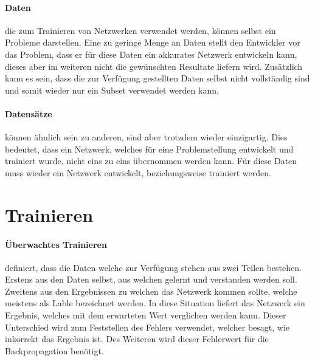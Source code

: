 
\paragraph{Daten} die zum Trainieren von Netzwerken verwendet werden, können selbst ein Probleme darstellen.
Eine zu geringe Menge an Daten stellt den Entwickler vor das Problem, dass er für diese Daten ein akkurates Netzwerk entwickeln kann, dieses aber im weiteren nicht die gewünschten Resultate liefern wird.
Zusätzlich kann es sein, dass die zur Verfügung gestellten Daten selbst nicht vollständig sind und somit wieder nur ein Subset verwendet werden kann.

\paragraph{Datensätze} können ähnlich sein zu anderen, sind aber trotzdem wieder einzigartig. 
Dies bedeutet, dass ein Netzwerk, welches für eine Problemstellung entwickelt und trainiert wurde, nicht eins zu eins übernommen werden kann.
Für diese Daten muss wieder ein Netzwerk entwickelt, beziehungsweise trainiert werden.

\section{Trainieren}

\paragraph{Überwachtes Trainieren} definiert, dass die Daten welche zur Verfügung stehen aus zwei Teilen bestehen.
Erstens aus den Daten selbst, aus welchen gelernt und verstanden werden soll.
Zweitens aus den Ergebnissen zu welchen das Netzwerk kommen sollte, welche meistens als Lable bezeichnet werden. 
In diese Situation liefert das Netzwerk ein Ergebnis, welches mit dem erwarteten Wert verglichen werden kann.
Dieser Unterschied wird zum Feststellen des Fehlers verwendet, welcher besagt, wie inkorrekt das Ergebnis ist.
Des Weiteren wird dieser Fehlerwert für die Backpropagation benötigt.

